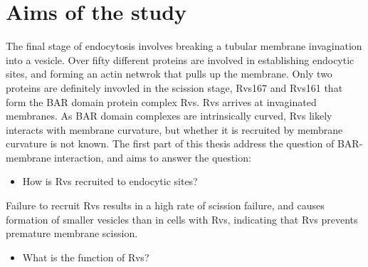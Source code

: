 
\chapter{Aims of the study} %

\label{Ch:Aims} %

The final stage of endocytosis involves breaking a tubular membrane invagination into a vesicle. Over fifty different proteins are involved in establishing endocytic sites, and forming an actin netwrok that pulls up the membrane. Only two proteins are  definitely invovled in the scission stage, Rvs167 and Rvs161 that form the  BAR domain protein complex Rvs. Rvs arrives at invaginated membranes. As BAR domain complexes are intrinsically curved, Rvs likely interacts with membrane curvature, but whether it is recruited by membrane curvature is not known. The first part of this thesis address the question of BAR-membrane interaction, and aims to answer the question:


\begin{itemize}
	\item How is Rvs recruited to endocytic sites? 
\end{itemize}

Failure to recruit Rvs results in a high rate of scission failure, and causes formation of smaller vesicles than in cells with Rvs, indicating that Rvs prevents premature membrane scission.

\begin{itemize}
	\item What is the function of Rvs?
\end{itemize}